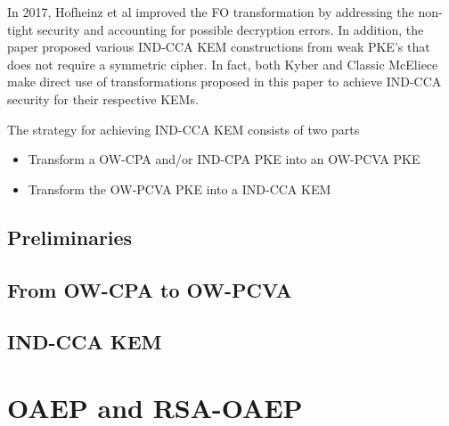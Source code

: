 \documentclass{article}
\begin{document}
In 2017, Hofheinz et al \cite{hofheinz2017modular} improved the FO transformation by addressing the non-tight security and accounting for possible decryption errors. In addition, the paper proposed various IND-CCA KEM constructions from weak PKE's that does not require a symmetric cipher. In fact, both Kyber \cite{avanzi2019crystals} and Classic McEliece \cite{albrecht2022classic} make direct use of transformations proposed in this paper to achieve IND-CCA security for their respective KEMs.

The strategy for achieving IND-CCA KEM consists of two parts

\begin{itemize}
    \item Transform a OW-CPA and/or IND-CPA PKE into an OW-PCVA PKE
    \item Transform the OW-PCVA PKE into a IND-CCA KEM
\end{itemize}

\subsection{Preliminaries}

\subsection{From OW-CPA to OW-PCVA}

\subsection{IND-CCA KEM}

\section{OAEP and RSA-OAEP}



\end{document}
